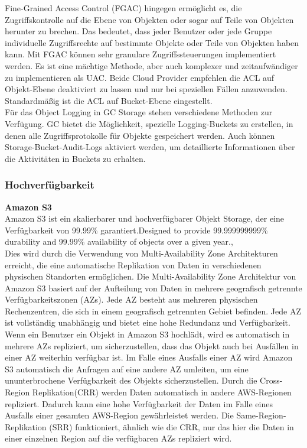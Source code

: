 Fine-Grained Access Control (FGAC) hingegen ermöglicht es, die Zugriffskontrolle auf die Ebene von Objekten oder sogar auf Teile von Objekten herunter zu brechen. Das bedeutet, dass jeder Benutzer oder jede Gruppe individuelle Zugriffsrechte auf bestimmte Objekte oder Teile von Objekten haben kann. Mit FGAC können sehr granulare Zugriffssteuerungen implementiert werden. Es ist eine mächtige Methode, aber auch komplexer und zeitaufwändiger zu implementieren als UAC. Beide Cloud Provider empfehlen die ACL auf Objekt-Ebene deaktiviert zu lassen und nur bei speziellen Fällen anzuwenden. Standardmäßig ist die ACL auf Bucket-Ebene eingestellt.\\

Für das Object Logging in GC Storage stehen verschiedene Methoden zur Verfügung. GC bietet die Möglichkeit, spezielle Logging-Buckets zu erstellen, in denen alle Zugriffsprotokolle für Objekte gespeichert werden. Auch können Storage-Bucket-Audit-Logs aktiviert werden, um detaillierte Informationen über die Aktivitäten in Buckets zu erhalten.

\newpage

\subsubsection{Hochverfügbarkeit}

\textbf{Amazon S3}\\

Amazon S3 ist ein skalierbarer und hochverfügbarer Objekt Storage, der eine Verfügbarkeit von 99.99\% garantiert.\glqq Designed to provide 99.999999999\% durability and 99.99\% availability of objects over a given year.\grqq, \cite{aws-availability}\\

Dies wird durch die Verwendung von Multi-Availability Zone Architekturen erreicht, die eine automatische Replikation von Daten in verschiedenen physischen Standorten ermöglichen. Die Multi-Availability Zone Architektur von Amazon S3 basiert auf der Aufteilung von Daten in mehrere geografisch getrennte Verfügbarkeitszonen (AZs). Jede AZ besteht aus mehreren physischen Rechenzentren, die sich in einem geografisch getrennten Gebiet befinden. Jede AZ ist vollständig unabhängig und bietet eine hohe Redundanz und Verfügbarkeit. Wenn ein Benutzer ein Objekt in Amazon S3 hochlädt, wird es automatisch in mehrere AZs repliziert, um sicherzustellen, dass das Objekt auch bei Ausfällen in einer AZ weiterhin verfügbar ist. Im Falle eines Ausfalls einer AZ wird Amazon S3 automatisch die Anfragen auf eine andere AZ umleiten, um eine ununterbrochene Verfügbarkeit des Objekts sicherzustellen. Durch die Cross-Region Replikation(CRR) werden Daten automatisch in andere AWS-Regionen repliziert. Dadurch kann eine hohe Verfügbarkeit der Daten im Falle eines Ausfalls einer gesamten AWS-Region gewährleistet werden. Die Same-Region-Replikation (SRR) funktioniert, ähnlich wie die CRR, nur das hier die Daten in einer einzelnen Region auf die verfügbaren AZs repliziert wird.\\

